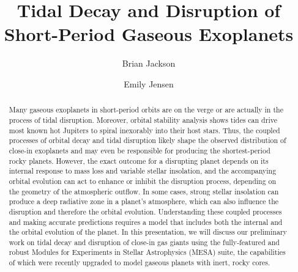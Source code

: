 \documentclass[smallcondensed]{svjour3}    %
\begin{document}
\title{Tidal Decay and Disruption of Short-Period Gaseous Exoplanets}




\author{Brian Jackson         \and
        Emily Jensen %
}




\maketitle


\begin{abstract}
Many gaseous exoplanets in short-period orbits are on the verge or are
actually in the process of tidal disruption. Moreover, orbital
stability analysis shows tides can drive most known hot Jupiters to
spiral inexorably into their host stars. Thus, the coupled processes
of orbital decay and tidal disruption likely shape the observed
distribution of close-in exoplanets and may even be responsible for
producing the shortest-period rocky planets. However, the exact
outcome for a disrupting planet depends on its internal response to
mass loss and variable stellar insolation, and the accompanying
orbital evolution can act to enhance or inhibit the disruption
process, depending on the geometry of the atmospheric outflow. In some
cases, strong stellar insolation can produce a deep radiative zone in
a planet's atmosphere, which can also influence the disruption and
therefore the orbital evolution. Understanding these coupled processes
and making accurate predictions requires a model that includes both
the internal and the orbital evolution of the planet. In this
presentation, we will discuss our preliminary work on tidal decay and
disruption of close-in gas giants using the fully-featured and robust
Modules for Experiments in Stellar Astrophysics (MESA) suite, the
capabilities of which were recently upgraded to model gaseous planets
with inert, rocky cores.

\end{abstract}
\end{document}
